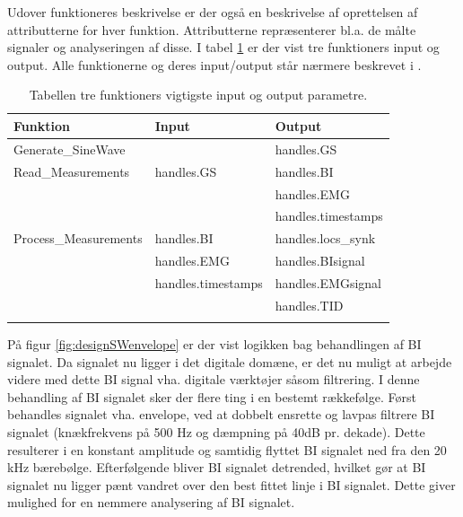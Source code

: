 Udover funktioneres beskrivelse er der også en beskrivelse af oprettelsen af attributterne for hver funktion. Attributterne repræsenterer bl.a. de målte signaler og analyseringen af disse. I tabel \ref{tab:SWinputoutput} er der vist tre funktioners input og output. Alle funktionerne og deres input/output står nærmere beskrevet i .


\begin{table}[H]
\center
\begin{tabularx}{\linewidth}{l  X  X}
     \textbf{Funktion}	&	\textbf{Input}		&	\textbf{Output} \\ \midrule
     Generate\_SineWave   	&		&	handles.GS\\   \addlinespace[2mm]\hline\addlinespace[2mm]
Read\_Measurements	&	handles.GS	&	handles.BI\\   \addlinespace[2mm]
			    &		&	handles.EMG\\   \addlinespace[2mm]
			    &		&	handles.timestamps\\   \addlinespace[2mm]\hline\addlinespace[2mm]
			    Process\_Measurements    &	handles.BI	&	handles.locs\_synk\\   \addlinespace[2mm]
						&	handles.EMG	&	handles.BIsignal\\   \addlinespace[2mm]
						&	handles.timestamps	&	handles.EMGsignal\\   \addlinespace[2mm]
						&	& handles.TID	\\   \addlinespace[2mm]\hline\addlinespace[2mm]
						 \bottomrule                                                                                                                   
    \end{tabularx}
    \caption {Tabellen tre funktioners vigtigste input og output parametre.}
    \label{tab:SWinputoutput}
	
\end{table}

På figur \ref{fig:designSWenvelope} er der vist logikken bag behandlingen af BI signalet. Da signalet nu ligger i det digitale domæne, er det nu muligt at arbejde videre med dette BI signal vha. digitale værktøjer såsom filtrering. I denne behandling af BI signalet sker der flere ting i en bestemt rækkefølge. Først behandles signalet vha. envelope, ved at dobbelt ensrette og lavpas filtrere BI signalet (knækfrekvens på 500 Hz og dæmpning på 40dB pr. dekade). Dette resulterer i en konstant amplitude og samtidig flyttet BI signalet ned fra den 20 kHz bærebølge. Efterfølgende bliver BI signalet detrended, hvilket gør at BI signalet nu ligger pænt vandret over den best fittet linje i BI signalet. Dette giver mulighed for en nemmere analysering af BI signalet. 

